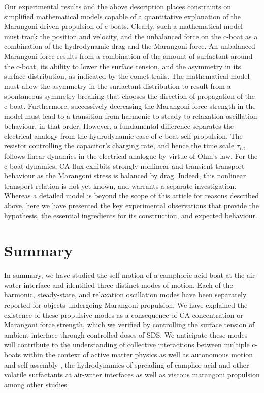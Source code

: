 \documentclass[journal=langd5, manuscript=article, layout=twocolumn]{achemso}
\begin{document}
Our experimental results and the above description places constraints on simplified mathematical models capable of a quantitative explanation of the Marangoni-driven propulsion of c-boats. Clearly, such a mathematical model must track the position and velocity, and the unbalanced force on the c-boat as a combination of the hydrodynamic drag and the Marangoni force. An unbalanced Marangoni force results from a combination of the amount of surfactant around the c-boat, its ability to lower the surface tension, and the asymmetry in its surface distribution, as indicated by the comet trails. The mathematical model must allow the asymmetry in the surfactant distribution to result from a spontaneous symmetry breaking that chooses the direction of propagation of the c-boat. Furthermore, successively decreasing the Marangoni force strength in the model must lead to a transition from harmonic to steady to relaxation-oscillation behaviour, in that order. However, a fundamental difference separates the electrical analogy from the hydrodynamic case of c-boat self-propulsion. The resistor controlling the capacitor's charging rate, and hence the time scale $\tau_C$, follows linear dynamics in the electrical analogue by virtue of Ohm's law. For the c-boat dynamics, CA flux exhibits strongly nonlinear and transient transport behaviour as the Marangoni stress is balanced by drag. Indeed, this nonlinear transport relation is not yet known, and warrants a separate investigation. Whereas a detailed model is beyond the scope of this article for reasons described above, here we have presented the key experimental observations that provide the hypothesis, the essential ingredients for its construction, and expected behaviour.

\section{Summary}
In summary, we have studied the self-motion of a camphoric acid boat at the air-water interface and identified three distinct modes of motion. Each of the harmonic, steady-state, and relaxation oscillation modes have been separately reported \cite{Hayashima2001, Suematsu2010, Jin2012, Velev2012} for objects undergoing Marangoni propulsion. We have explained the existence of these propulsive modes as a consequence of CA concentration or Marangoni force strength, which we verified by controlling the surface tension of ambient interface through controlled doses of SDS. We anticipate these modes will contribute to the understanding of collective interactions between multiple c-boats within the context of active matter physics \cite{Ramaswamy2010} as well as autonomous motion and self-assembly \cite{Ismagilov2002}, the hydrodynamics of spreading of camphor acid and other volatile surfactants at air-water interfaces \cite{Troian1998} as well as viscous marangoni propulsion \cite{Lauga2012} among other studies.
\end{document}
